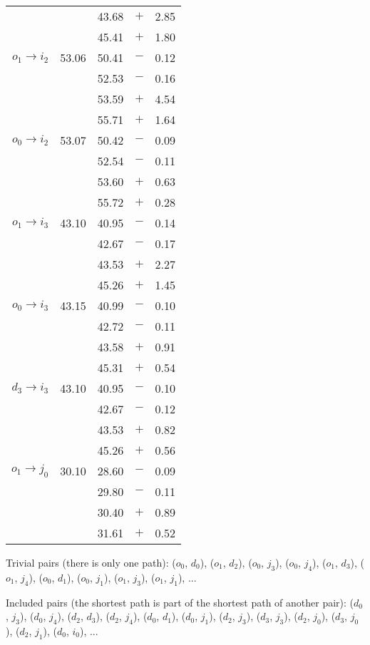 \documentclass[11pt, a4paper]{article}
\newcommand{\sprule}{\rule{0pt}{1.3em}}
\begin{document}
\begin{longtable}{rrrcr}
              &       & 43.68 & $+$ & 2.85 \\
              &       & 45.41 & $+$ & 1.80 \\
    \sprule
    $o_1 \to i_2$ & 53.06 & 50.41 & $-$ & 0.12 \\
              &       & 52.53 & $-$ & 0.16 \\
              &       & 53.59 & $+$ & 4.54 \\
              &       & 55.71 & $+$ & 1.64 \\
    \sprule
    $o_0 \to i_2$ & 53.07 & 50.42 & $-$ & 0.09 \\
              &       & 52.54 & $-$ & 0.11 \\
              &       & 53.60 & $+$ & 0.63 \\
              &       & 55.72 & $+$ & 0.28 \\
    \sprule
    $o_1 \to i_3$ & 43.10 & 40.95 & $-$ & 0.14 \\
              &       & 42.67 & $-$ & 0.17 \\
              &       & 43.53 & $+$ & 2.27 \\
              &       & 45.26 & $+$ & 1.45 \\
    \sprule
    $o_0 \to i_3$ & 43.15 & 40.99 & $-$ & 0.10 \\
              &       & 42.72 & $-$ & 0.11 \\
              &       & 43.58 & $+$ & 0.91 \\
              &       & 45.31 & $+$ & 0.54 \\
    \sprule
    $d_3 \to i_3$ & 43.10 & 40.95 & $-$ & 0.10 \\
              &       & 42.67 & $-$ & 0.12 \\
              &       & 43.53 & $+$ & 0.82 \\
              &       & 45.26 & $+$ & 0.56 \\
	\sprule
	$o_1 \to j_0$ & 30.10 & 28.60 & $-$ & 0.09 \\
              &       & 29.80 & $-$ & 0.11 \\
              &       & 30.40 & $+$ & 0.89 \\
              &       & 31.61 & $+$ & 0.52 \\
	\bottomrule
\end{longtable}

Trivial pairs (there is only one path): ($o_0$, $d_0$), ($o_1$, $d_2$),
($o_0$, $j_3$),
($o_0$, $j_4$),
($o_1$, $d_3$),
($o_1$, $j_4$),
($o_0$, $d_1$),
($o_0$, $j_1$),
($o_1$, $j_3$),
($o_1$, $j_1$), ...

Included pairs (the shortest path is part of the shortest path of another
pair):
($d_0$, $j_3$),
($d_0$, $j_4$),
($d_2$, $d_3$),
($d_2$, $j_4$),
($d_0$, $d_1$),
($d_0$, $j_1$),
($d_2$, $j_3$),
($d_3$, $j_3$),
($d_2$, $j_0$),
($d_3$, $j_0$),
($d_2$, $j_1$),
($d_0$, $i_0$), ...
\end{document}
